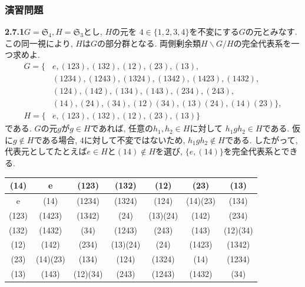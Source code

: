 \subsubsection*{演習問題}
\textbf{2.7.1}\quad $G=\mathfrak{S}_4, H=\mathfrak{S}_3$とし, $H$の元を
$4\in \{1,2,3,4\}$を不変にする$G$の元とみなす. この同一視により, $H$は$G$の部分群となる.
両側剰余類$H\backslash G/H$の完全代表系を一つ求めよ.\newline
\begin{align*}
  G =\{& e,(123),(132),(12),(23),(13),\\
  & (1234),(1243),(1324),(1342),(1423),(1432),\\
  & (124),(142),(134),(143),(234),(243),\\
  & (14),(24),(34),(12)(34),(13)(24),(14)(23)\},\\
  H= \{& e,(123), (132), (12), (23), (13)\}
\end{align*}
である.
 $G$の元$g$が$g\in H$であれば, 任意の$h_1, h_2 \in H$に対して
 $h_1gh_2 \in H$である.
 仮に$g \notin H$である場合, $4$に対して不変ではないため,
 $h_1gh_2 \notin H$である. したがって, 
 代表元としてたとえば$e \in H$と$(14) \notin H$を選び,
 $\{e, (14)\}$を完全代表系とできる.\\

 \begin{tabular}{c|cccccc}
    (14) & e       &(123)    &(132)    &(12)     &(23)     &(13) \\ \hline
     e   &(14)     &(1234)   &(1324)   &(124)    &(14)(23) &(134)  \\ 
   (123) &(1423)   &(1342)   &(24)     &(13)(24) &(142)    &(234)  \\ 
   (132) &(1432)   &(34)     &(1243)   &(243)    &(143)    &(12)(34)  \\ 
   (12)  &(142)    &(234)    &(13)(24) &(24)     &(1423)   &(1342)  \\ 
   (23)  &(14)(23) &(134)    &(124)    &(1324)   &(14)     &(1234)  \\ 
   (13)  &(143)    &(12)(34) &(243)    &(1243)   &(1432)   &(34)  \\ 
 \end{tabular}\leavevmode\newline

